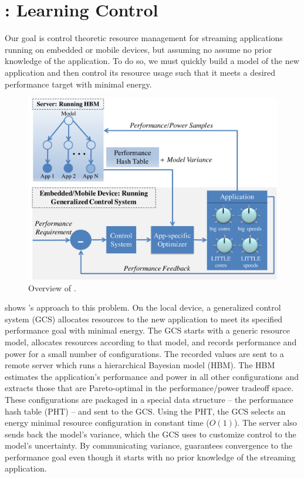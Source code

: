 \section{\SYSTEM{}: Learning Control}
\label{sec:framework}
Our goal is control theoretic resource management for streaming
applications running on embedded or mobile devices, but assuming no
assume no prior knowledge of the application.  To do so, we must
quickly build a model of the new application and then control its
resource usage such that it meets a desired performance target with
minimal energy.

\begin{figure}
\includegraphics[width=\columnwidth]{figures/ControlLearning2.pdf}
\caption{Overview of \SYSTEM{}.}
\label{fig:overview}
\end{figure}


 shows \SYSTEM{}'s approach to this problem.  On
the local device, a generalized control system (GCS) allocates
resources to the new application to meet its specified performance
goal with minimal energy.  The GCS starts with a generic resource
model, allocates resources according to that model, and records
performance and power for a small number of configurations.  The
recorded values are sent to a remote server which runs a hierarchical
Bayesian model (HBM).  The HBM estimates the application's performance
and power in all other configurations and extracts those that are
Pareto-optimal in the performance/power tradeoff space.  These
configurations are packaged in a special data structure -- the
performance hash table (PHT) -- and sent to the GCS.  Using the PHT,
the GCS selects an energy minimal resource configuration in constant
time ($O(1)$).  The server also sends back the model's variance, which
the GCS uses to customize control to the model's uncertainty. By
communicating variance, \SYSTEM{} guarantees convergence to the
performance goal even though it starts with no prior knowledge of the
streaming application.

